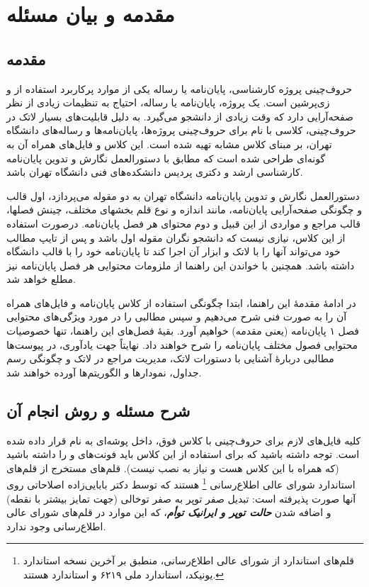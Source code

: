 
\chapter{مقدمه و بیان مسئله}
\section{مقدمه}
حروف‌چینی پروژه کارشناسی، پایان‌نامه یا رساله یکی از موارد پرکاربرد استفاده از
\lr{\LaTeX}
و زی‌پرشین
\cite{Khalighi87xepersian}
است. یک پروژه، پایان‌نامه یا رساله، احتیاج به تنظیمات زیادی از نظر صفحه‌آرایی دارد که وقت زیادی از دانشجو می‌گیرد. به دلیل قابلیت‌های بسیار لاتک در حروف‌چینی، کلاسی با نام 
برای حروف‌چینی پروژه‌ها، پایان‌نامه‌ها و رساله‌های دانشگاه تهران، بر مبنای کلاس مشابه
تهیه شده است. این کلاس و فایل‌های همراه آن به گونه‌ای طراحی شده است که مطابق با دستورالعمل نگارش و تدوین پایان‌نامه کارشناسی ارشد و دکتری پردیس دانشکده‌های فنی دانشگاه تهران
\cite{UTThesisGuide}
باشد.

دستورالعمل نگارش و تدوین پایان‌نامه دانشگاه تهران به دو مقوله می‌پردازد، اول قالب و چگونگی صفحه‌آرایی پایان‌نامه، مانند اندازه و نوع قلم بخشهای مختلف، چینش فصلها، قالب مراجع و مواردی از این قبیل و دوم محتوای هر فصل پایان‌نامه. 
درصورت استفاده از این کلاس، نیازی نیست که دانشجو نگران مقوله اول باشد و پس از تایپ مطالب خود می‌تواند آنها را با لاتک و ابزار آن اجرا کند تا پایان‌نامه خود را با قالب دانشگاه داشته باشد. همچنین با خواندن این راهنما از ملزومات محتوایی هر فصل پایان‌نامه نیز مطلع خواهد شد.

در ادامهٔ  مقدمهٔ این راهنما، ابتدا چگونگی استفاده از کلاس پایان‌نامه و فایل‌های همراه آن را به صورت فنی شرح می‌دهیم و سپس مطالبی را در مورد ویژگی‌های محتوایی فصل ۱ پایان‌نامه (یعنی مقدمه) خواهیم آورد.
بقیهٔ فصل‌های این راهنما، تنها خصوصیات محتوایی فصول مختلف پایان‌نامه را شرح خواهند داد. نهایتاً جهت یادآوری، در پیوست‌ها مطالبی دربارهٔ آشنایی با دستورات لاتک، مدیریت مراجع در لاتک و چگونگی رسم جداول، نمودارها و الگوریتم‌ها آورده خواهند شد.

\section{شرح مسئله و روش انجام آن}
کلیه فایل‌های لازم برای حروف‌چینی با کلاس فوق، داخل پوشه‌ای به نام
قرار داده شده است. توجه داشته باشید که برای استفاده از این کلاس باید فونت‌های
و
را داشته باشید (که همراه با این کلاس هست و نیاز به نصب نیست).
قلم‌های
مستخرج از قلم‌های استاندارد
شورای عالی اطلاع‌رسانی%
\footnote{
قلم‌های استاندارد
از شورای عالی اطلاع‌رسانی، منطبق بر آخرین نسخه استاندارد یونیکد، استاندارد ملی ۶۲۱۹ و استاندارد
هستند.
}
هستند که توسط دکتر بابایی‌زاده اصلاحاتی روی آنها صورت پذیرفته است: تبدیل صفر توپر به صفر توخالی (جهت تمایز بیشتر با نقطه) و اضافه شدن
\textit{\textbf{حالت توپر و ایرانیک توأم}}،
که این موارد در قلم‌های شورای عالی اطلاع‌رسانی وجود ندارد.


